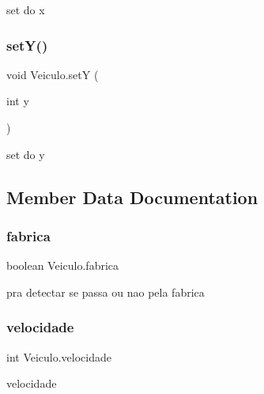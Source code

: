 set do x 

\mbox{\label{class_veiculo_a57cb54424b47643d8b388c72dbaf43b1}} 
\subsubsection{\texorpdfstring{set\+Y()}{setY()}}
{\footnotesize\ttfamily void Veiculo.\+setY (\begin{DoxyParamCaption}\item[{int}]{y }\end{DoxyParamCaption})}



set do y 



\subsection{Member Data Documentation}
\mbox{\label{class_veiculo_a23d377a69bdf558ebedb5bc35dcdebf5}} 
\subsubsection{\texorpdfstring{fabrica}{fabrica}}
{\footnotesize\ttfamily boolean Veiculo.\+fabrica\hspace{0.3cm}{\ttfamily [protected]}}



pra detectar se passa ou nao pela fabrica 

\mbox{\label{class_veiculo_a2edf5e3132b1c2504c441dc095dc7e0e}} 
\subsubsection{\texorpdfstring{velocidade}{velocidade}}
{\footnotesize\ttfamily int Veiculo.\+velocidade\hspace{0.3cm}{\ttfamily [protected]}}



velocidade 

\mbox{\label{class_veiculo_a069917a284297fe5b385258b2afd9ad6}} 

